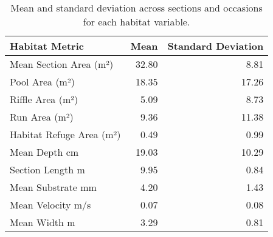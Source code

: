 \begin{table}[ht]
\centering
\caption{Mean and standard deviation across sections and occasions for each habitat variable.} 
\label{tab:habitat}
\begin{tabular}{lrr}
  \hline
Habitat Metric & Mean & Standard Deviation \\ 
  \hline
Mean Section Area (m²) & 32.80 & 8.81 \\ 
  Pool Area (m²) & 18.35 & 17.26 \\ 
  Riffle Area (m²) & 5.09 & 8.73 \\ 
  Run Area (m²) & 9.36 & 11.38 \\ 
  Habitat Refuge Area (m²) & 0.49 & 0.99 \\ 
  Mean Depth cm & 19.03 & 10.29 \\ 
  Section Length m & 9.95 & 0.84 \\ 
  Mean Substrate mm & 4.20 & 1.43 \\ 
  Mean Velocity m/s & 0.07 & 0.08 \\ 
  Mean Width m & 3.29 & 0.81 \\ 
   \hline
\end{tabular}
\end{table}
